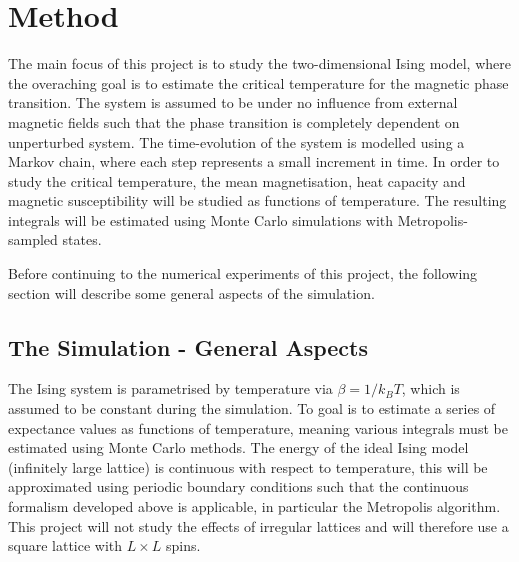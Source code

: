 \documentclass[nofootinbib,reprint,english]{revtex4-1}
\begin{document}
\section{Method}
The main focus of this project is to study the two-dimensional Ising model, where the overaching goal is to estimate the critical temperature for the magnetic phase transition. The system is assumed to be under no influence from external magnetic fields such that the phase transition is completely dependent on unperturbed system. The time-evolution of the system is modelled using a Markov chain, where each step represents a small increment in time. In order to study the critical temperature, the mean magnetisation, heat capacity and magnetic susceptibility will be studied as functions of temperature. The resulting integrals will be estimated using Monte Carlo simulations with Metropolis-sampled states.

Before continuing to the numerical experiments of this project, the following section will describe some general aspects of the simulation.
\subsection{The Simulation - General Aspects}
The Ising system is parametrised by temperature via \(\beta=1/k_BT\), which is assumed to be constant during the simulation. To goal is to estimate a series of expectance values as functions of temperature, meaning various integrals must be estimated using Monte Carlo methods. The energy of the ideal Ising model (infinitely large lattice) is continuous with respect to temperature, this will be approximated using periodic boundary conditions such that the continuous formalism developed above is applicable, in particular the Metropolis algorithm. This project will not study the effects of irregular lattices and will therefore use a square lattice with \(L\times L\) spins.
\end{document}
